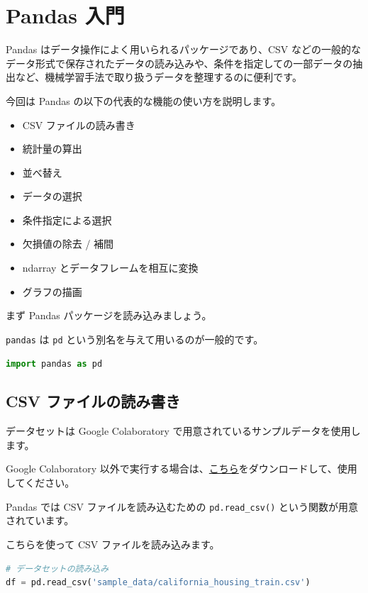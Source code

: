 \chapter{Pandas 入門}


Pandas はデータ操作によく用いられるパッケージであり、CSV などの一般的なデータ形式で保存されたデータの読み込みや、条件を指定しての一部データの抽出など、機械学習手法で取り扱うデータを整理するのに便利です。


今回は Pandas の以下の代表的な機能の使い方を説明します。


\begin{itemize}
\item CSV ファイルの読み書き
\item 統計量の算出
\item 並べ替え
\item データの選択
\item 条件指定による選択
\item 欠損値の除去 / 補間
\item ndarray とデータフレームを相互に変換
\item グラフの描画
\end{itemize}


まず Pandas パッケージを読み込みましょう。

\texttt{pandas} は \texttt{pd} という別名を与えて用いるのが一般的です。


\begin{lstlisting}[style=codecell,language=Python]
import pandas as pd
\end{lstlisting}

\section{CSV ファイルの読み書き}


データセットは Google Colaboratory で用意されているサンプルデータを使用します。

Google Colaboratory 以外で実行する場合は、\href{https://download.mlcc.google.com/mledu-datasets/california_housing_train.csv}{こちら}をダウンロードして、使用してください。


Pandas では CSV ファイルを読み込むための \texttt{pd.read\_csv()} という関数が用意されています。

こちらを使って CSV ファイルを読み込みます。


\begin{lstlisting}[style=codecell,language=Python]
# データセットの読み込み
df = pd.read_csv('sample_data/california_housing_train.csv')
\end{lstlisting}

